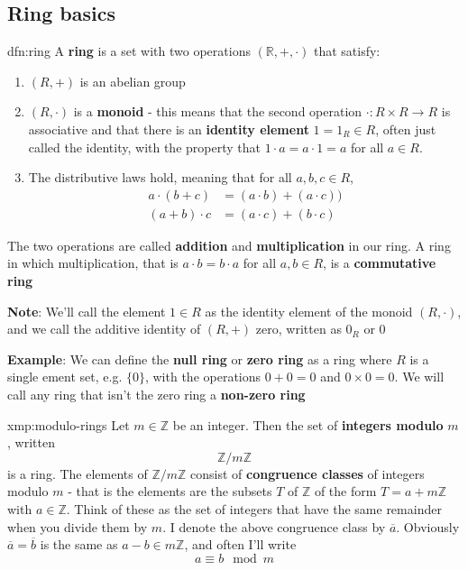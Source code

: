 \documentclass[landscape, 8pt]{extarticle}
\begin{document}
\begin{multicols}{3}
\subsection{Ring basics}
\begin{dfn}{dfn:ring}{}
    A \textbf{ring} is a set with two operations $(\mathbb{R}, +, \cdot)$ that satisfy:
    \begin{enumerate}
        \item $(R, +)$ is an abelian group
        \item $(R, \cdot)$ is a \textbf{monoid} - this means that the second operation $\cdot : R \times R \to R$ is associative and that there is an \textbf{identity element} $1 = 1_{R}\in R$, often just called the identity, with the property that $1 \cdot a = a \cdot 1 = a$ for all $a\in R$.
        \item The distributive laws hold, meaning that for all $a,b,c\in R$,
            \begin{align*}
                a \cdot (b + c) &= (a \cdot b) + (a \cdot c)) \\
                (a + b) \cdot c &= (a \cdot c) + (b \cdot c)
            \end{align*}
    \end{enumerate}
    The two operations are called \textbf{addition} and \textbf{multiplication} in our ring. A ring in which multiplication, that is $a \cdot b = b \cdot a$ for all $a,b\in R$, is a \textbf{commutative ring}
\end{dfn}

\textbf{Note}: We'll call the element $1\in R$ as the identity element of the monoid $(R, \cdot)$, and we call the additive identity of $(R, +)$ zero, written as $0_{R}$ or $0$

\textbf{Example}: We can define the \textbf{null ring} or \textbf{zero ring} as a ring where $R$ is a single ement set, e.g. $\{0\}$, with the operations $0 + 0 = 0$ and $0 \times 0 = 0$. We will call any ring that isn't the zero ring a \textbf{non-zero ring}

\begin{xmp}{xmp:modulo-rings}{}
    Let $m\in \mathbb{Z}$ be an integer. Then the set of \textbf{integers modulo} $m$, written
    \[\mathbb{Z} / m\mathbb{Z}\]
    is a ring. The elements of $\mathbb{Z} / m\mathbb{Z}$ consist of \textbf{congruence classes} of integers modulo $m$ - that is the elements are the subsets $T$ of $\mathbb{Z}$ of the form $T = a + m\mathbb{Z}$ with $a\in \mathbb{Z}$. Think of these as the set of integers that have the same remainder when you divide them by $m$. I denote the above congruence class by $\overline{a}$. Obviously $\overline{a} = \overline{b}$ is the same as $a-b\in m\mathbb{Z}$, and often I'll write
    \[a \equiv b \mod m\]
\end{xmp}


\end{multicols}
\end{document}

